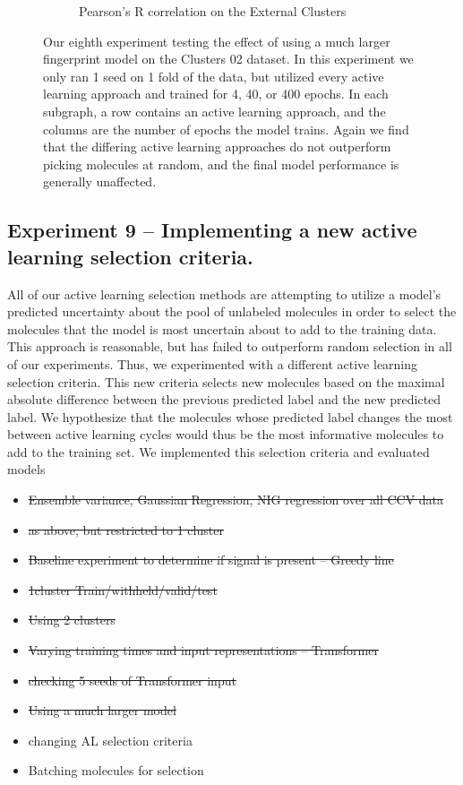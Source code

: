 \documentclass[journal=jmcmar,manuscript=article]{achemso}
\begin{document}
\begin{figure}[tbph]
\begin{subfigure}[b]{0.48\textwidth}
        \caption{Pearson's R correlation on the External Clusters}
    \end{subfigure}
    \caption{Our eighth experiment testing the effect of using a much larger fingerprint model on the Clusters 02 dataset. In this experiment we only ran 1 seed on 1 fold of the data, but utilized every active learning approach and trained for 4, 40, or 400 epochs. In each subgraph, a row contains an active learning approach, and the columns are the number of epochs the model trains. Again we find that the differing active learning approaches do not outperform picking molecules at random, and the final model performance is generally unaffected.}
    \label{fig:bigmodel}
\end{figure}

\subsection{Experiment 9 -- Implementing a new active learning selection criteria.}

All of our active learning selection methods are attempting to utilize a model's predicted uncertainty about the pool of unlabeled molecules in order to select the molecules that the model is most uncertain about to add to the training data. This approach is reasonable, but has failed to outperform random selection in all of our experiments. Thus, we experimented with a different active learning selection criteria. This new criteria selects new molecules based on the maximal absolute difference between the previous predicted label and the new predicted label. We hypothesize that the molecules whose predicted label changes the most between active learning cycles would thus be the most informative molecules to add to the training set. We implemented this selection criteria and evaluated models

\begin{itemize}
    \item \st{Ensemble variance, Gaussian Regression, NIG regression over all CCV data}
    \item \st{as above, but restricted to 1 cluster}
    \item \st{Baseline experiment to determine if signal is present -- Greedy line}
    \item \st{1cluster Train/withheld/valid/test}
    \item \st{Using 2 clusters}
    \item \st{Varying training times and input representations -- Transformer}
    \item \st{checking 5 seeds of Transformer input}
    \item \st{Using a much larger model}
    \item changing AL selection criteria 
    \item Batching molecules for selection
\end{itemize}
\end{document}
